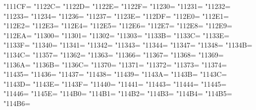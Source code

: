 \XeTeXcharclass"111CF=\KclassCM
\XeTeXcharclass"1122C=\KclassCM
\XeTeXcharclass"1122D=\KclassCM
\XeTeXcharclass"1122E=\KclassCM
\XeTeXcharclass"1122F=\KclassCM
\XeTeXcharclass"11230=\KclassCM
\XeTeXcharclass"11231=\KclassCM
\XeTeXcharclass"11232=\KclassCM
\XeTeXcharclass"11233=\KclassCM
\XeTeXcharclass"11234=\KclassCM
\XeTeXcharclass"11236=\KclassCM
\XeTeXcharclass"11237=\KclassCM
\XeTeXcharclass"1123E=\KclassCM
\XeTeXcharclass"112DF=\KclassCM
\XeTeXcharclass"112E0=\KclassCM
\XeTeXcharclass"112E1=\KclassCM
\XeTeXcharclass"112E2=\KclassCM
\XeTeXcharclass"112E3=\KclassCM
\XeTeXcharclass"112E4=\KclassCM
\XeTeXcharclass"112E5=\KclassCM
\XeTeXcharclass"112E6=\KclassCM
\XeTeXcharclass"112E7=\KclassCM
\XeTeXcharclass"112E8=\KclassCM
\XeTeXcharclass"112E9=\KclassCM
\XeTeXcharclass"112EA=\KclassCM
\XeTeXcharclass"11300=\KclassCM
\XeTeXcharclass"11301=\KclassCM
\XeTeXcharclass"11302=\KclassCM
\XeTeXcharclass"11303=\KclassCM
\XeTeXcharclass"1133B=\KclassCM
\XeTeXcharclass"1133C=\KclassCM
\XeTeXcharclass"1133E=\KclassCM
\XeTeXcharclass"1133F=\KclassCM
\XeTeXcharclass"11340=\KclassCM
\XeTeXcharclass"11341=\KclassCM
\XeTeXcharclass"11342=\KclassCM
\XeTeXcharclass"11343=\KclassCM
\XeTeXcharclass"11344=\KclassCM
\XeTeXcharclass"11347=\KclassCM
\XeTeXcharclass"11348=\KclassCM
\XeTeXcharclass"1134B=\KclassCM
\XeTeXcharclass"1134C=\KclassCM
\XeTeXcharclass"11357=\KclassCM
\XeTeXcharclass"11362=\KclassCM
\XeTeXcharclass"11363=\KclassCM
\XeTeXcharclass"11366=\KclassCM
\XeTeXcharclass"11367=\KclassCM
\XeTeXcharclass"11368=\KclassCM
\XeTeXcharclass"11369=\KclassCM
\XeTeXcharclass"1136A=\KclassCM
\XeTeXcharclass"1136B=\KclassCM
\XeTeXcharclass"1136C=\KclassCM
\XeTeXcharclass"11370=\KclassCM
\XeTeXcharclass"11371=\KclassCM
\XeTeXcharclass"11372=\KclassCM
\XeTeXcharclass"11373=\KclassCM
\XeTeXcharclass"11374=\KclassCM
\XeTeXcharclass"11435=\KclassCM
\XeTeXcharclass"11436=\KclassCM
\XeTeXcharclass"11437=\KclassCM
\XeTeXcharclass"11438=\KclassCM
\XeTeXcharclass"11439=\KclassCM
\XeTeXcharclass"1143A=\KclassCM
\XeTeXcharclass"1143B=\KclassCM
\XeTeXcharclass"1143C=\KclassCM
\XeTeXcharclass"1143D=\KclassCM
\XeTeXcharclass"1143E=\KclassCM
\XeTeXcharclass"1143F=\KclassCM
\XeTeXcharclass"11440=\KclassCM
\XeTeXcharclass"11441=\KclassCM
\XeTeXcharclass"11443=\KclassCM
\XeTeXcharclass"11444=\KclassCM
\XeTeXcharclass"11445=\KclassCM
\XeTeXcharclass"11446=\KclassCM
\XeTeXcharclass"1145E=\KclassCM
\XeTeXcharclass"114B0=\KclassCM
\XeTeXcharclass"114B1=\KclassCM
\XeTeXcharclass"114B2=\KclassCM
\XeTeXcharclass"114B3=\KclassCM
\XeTeXcharclass"114B4=\KclassCM
\XeTeXcharclass"114B5=\KclassCM
\XeTeXcharclass"114B6=\KclassCM
